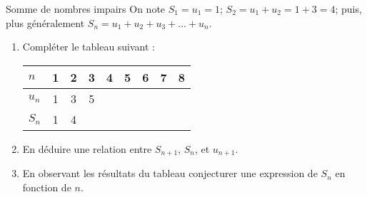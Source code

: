 \begin{myact}{Somme de nombres impairs}
	On note $S_1=u_1=1$; $S_2=u_1+u_2=1+3=4$; puis, plus généralement $S_n=u_1+u_2+u_3+...+u_n$.
	
	\begin{enumerate}
		\item Compléter le tableau suivant :\\
		\begin{tabular}{|@{\ \ }l@{\ \ }|@{\ \ }c@{\ \ }|@{\ \ }c@{\ \ }|@{\ \ }c@{\ \ }|@{\ \ }c@{\ \ }|@{\ \ }c@{\ \ }|@{\ \ }c@{\ \ }|@{\ \ }c@{\ \ }|@{\ \ }c@{\ \ }|}
			\hline
			$n$   & 1 & 2 & 3 & 4 & 5 & 6 & 7 & 8 \\ \hline
			$u_n$ & 1 & 3 & 5 &   &   &   &   &   \\ \hline
			$S_n$ & 1 & 4 &   &   &   &   &   &   \\ \hline
		\end{tabular}
		
		\item En déduire une relation entre $S_{n+1}$, $S_{n}$, et $u_{n+1}$.
		
		\item En observant les résultats du tableau conjecturer une expression de $S_n$ en fonction de $n$.
	\end{enumerate}
\end{myact}


		
		
	
